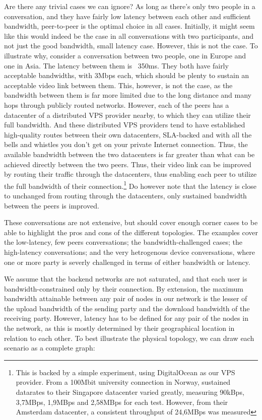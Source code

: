 Are there any trivial cases we can ignore? As long as there's only two people in a conversation, and they have fairly low latency between each other and sufficient bandwidth, peer-to-peer is the optimal choice in all cases. Initially, it might seem like this would indeed be the case in all conversations with two participants, and not just the good bandwidth, small latency case. However, this is not the case. To illustrate why, consider a conversation between two people, one in Europe and one in Asia. The latency between them is ~350ms. They both have fairly acceptable bandwidths, with 3Mbps each, which should be plenty to sustain an acceptable video link between them. This, however, is not the case, as the bandwidth between them is far more limited due to the long distance and many hops through publicly routed networks. However, each of the peers has a datacenter of a distributed VPS provider nearby, to which they can utilize their full bandwidth. And these distributed VPS providers tend to have established high-quality routes between their own datacenters, SLA-backed and with all the bells and whistles you don't get on your private Internet connection. Thus, the available bandwidth between the two datacenters is far greater than what can be achieved directly between the two peers. Thus, their video link can be improved by routing their traffic through the datacenters, thus enabling each peer to utilize the full bandwidth of their connection.\footnote{This is backed by a simple experiment, using DigitalOcean as our VPS provider. From a 100Mbit university connection in Norway, sustained datarates to their Singapore datacenter varied greatly, measuring 90kBps, 3,7MBps, 1,9MBps and 2,58MBps for each test. However, from their Amsterdam datacenter, a consistent throughput of 24,6MBps was measured} Do however note that the latency is close to unchanged from routing through the datacenters, only sustained bandwidth between the peers is improved.

These conversations are not extensive, but should cover enough corner cases to be able to highlight the pros and cons of the different topologies. The examples cover the low-latency, few peers conversations; the bandwidth-challenged cases; the high-latency conversations; and the very hetrogenous device conversations, where one or more party is severly challenged in terms of either bandwidth or latency.

We assume that the backend networks are not saturated, and that each user is bandwidth-constrained only by their connection. By extension, the maximum bandwidth attainable between any pair of nodes in our network is the lesser of the upload bandwidth of the sending party and the download bandwidth of the receiving party. However, latency has to be defined for any pair of the nodes in the network, as this is mostly determined by their geographical location in relation to each other. To best illustrate the physical topology, we can draw each scenario as a complete graph:


